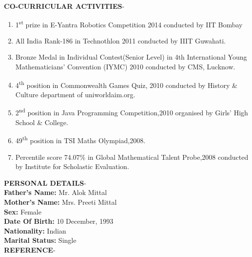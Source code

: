 \documentclass{article}
\begin{document}
	\textbf{CO-CURRICULAR ACTIVITIES}-
	\begin{enumerate}
		\item 1\textsuperscript{st} prize in E-Yantra Robotics Competition 2014 conducted by IIT Bombay
		\item All India Rank-186 in Technothlon 2011 conducted by IIIT Guwahati.
		\item Bronze Medal in Individual Contest(Senior Level) in 4th International Young Mathematicians' Convention (IYMC) 2010 conducted by CMS, Lucknow.
		\item 4\textsuperscript{th} position in Commonwealth Games Quiz, 2010 conducted by History & Culture department of uniworldaim.org.
		\item 2\textsuperscript{nd} position in Java Programming Competition,2010 organised by Girls' High School \& College.
		\item 49\textsuperscript{th} position in TSI Maths Olympiad,2008.
		\item Percentile score 74.07\% in Global Mathematical Talent Probe,2008 conducted by Institute for Scholastic Evaluation.\\[\baselineskip]
	\end{enumerate}
	\textbf{PERSONAL DETAILS}- \\
	\textbf{Father's Name:} Mr. Alok Mittal\\
	\textbf{Mother's Name:} Mrs. Preeti Mittal\\
	\textbf{Sex:} Female\\
	\textbf{Date Of Birth:} 10 December, 1993\\
	\textbf{Nationality:} Indian\\
	\textbf{Marital Status:} Single\\[\baselineskip]
	\textbf{REFERENCE}-
	
\end{document}
